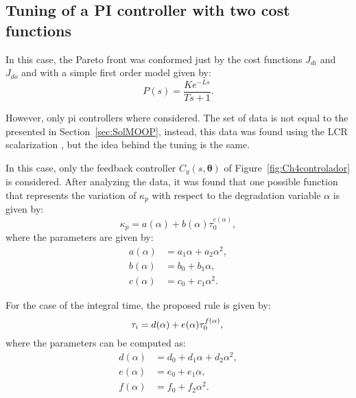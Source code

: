 \subsection{Tuning of a PI controller with two cost functions}
\label{sec:PI2FunMonica}
In this case, the Pareto front was conformed just by the cost functions $J_{di}$ and $J_{do}$ and with a simple first order model given by:
\begin{equation}
	P(s) = \frac{K e^{-Ls}}{Ts+1}.
\end{equation}

However, only \gls{pi} controllers where considered. The set of data is not equal to the presented in Section~\ref{sec:SolMOOP}, instead, this data was found using the LCR scalarization \citet{Rojas2015b}, but the idea behind the tuning is the same.

In this case, only the feedback controller $C_y(s,\bm{\theta})$ of Figure~\ref{fig:Ch4controlador} is considered. After analyzing the data, it was found that one possible function that represents the variation of $\kappa_p$ with respect to the degradation variable $\alpha$ is given by:
\begin{equation}  %
\kappa_p = a(\alpha) +b(\alpha)\tau_0^{c(\alpha)},
\label{ec:KpMonica}
\end{equation}
%
where the parameters are given by:
\begin{align*}
%
a(\alpha) &=  a_1 \alpha + a_2 \alpha^2,\\%
%
b(\alpha) &=  b_0  + b_1 \alpha,\\%
%
c(\alpha) &=  c_0  + c_1 \alpha^2.%
\end{align*}

For the case of the integral time, the proposed rule is given by:
\begin{equation}  %
\tau_i = d(\alpha) +e(\alpha)\tau_0^{f(\alpha)},	\label{ec:TiMonica}\\
\end{equation}
%
where the parameters can be computed as:
\begin{align*}  %
d(\alpha) &= d_0 + d_1 \alpha + d_2 \alpha^2,\\
%
e(\alpha) &= e_0 + e_1 \alpha,\\
%
f(\alpha) &= f_0 + f_2 \alpha^2.\\
\end{align*}

